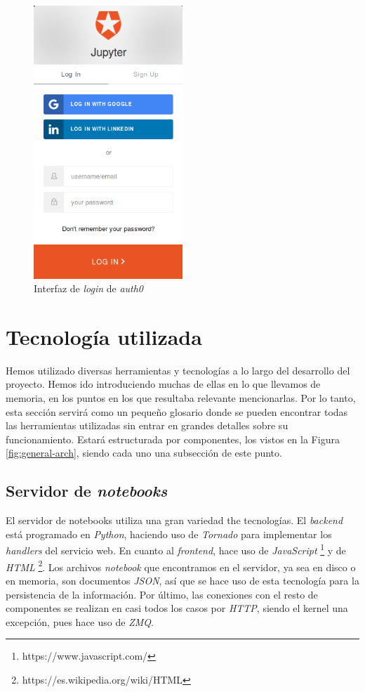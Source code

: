 \documentclass[11pt,spanish,listoffigures,listoftables]{tfgetsinf}
\begin{document}
\begin{figure}[H]
	\centering
  	\includegraphics[width=0.5\textwidth]{login.png}
  	\caption{Interfaz de \textit{login} de \textit{auth0}}
  	\label{fig:login}
\end{figure}



\section{Tecnología utilizada}
\label{sec:tecno-utilizada}

Hemos utilizado diversas herramientas y tecnologías a lo largo del desarrollo del proyecto. Hemos ido introduciendo muchas de ellas en lo que llevamos de memoria, en los puntos en los que resultaba relevante mencionarlas. Por lo tanto, esta sección servirá como un pequeño glosario donde se pueden encontrar todas las herramientas utilizadas sin entrar en grandes detalles sobre su funcionamiento. Estará estructurada por componentes, los vistos en la Figura \ref{fig:general-arch}, siendo cada uno una subsección de este punto.


\subsection{Servidor de \textit{notebooks}}
\label{subsec:tecno-server}

El servidor de notebooks utiliza una gran variedad the tecnologías. El \textit{backend} está programado en \textit{Python}, haciendo uso de \textit{Tornado} para implementar los \textit{handlers} del servicio web. En cuanto al \textit{frontend}, hace uso de \textit{JavaScript} \footnote{https://www.javascript.com/} y de \textit{HTML} \footnote{https://es.wikipedia.org/wiki/HTML}. Los archivos \textit{notebook} que encontramos en el servidor, ya sea en disco o en memoria, son documentos \textit{JSON}, así que se hace uso de esta tecnología para la persistencia de la información. Por último, las conexiones con el resto de componentes se realizan en casi todos los casos por \textit{HTTP}, siendo el kernel una excepción, pues hace uso de \textit{ZMQ}. 
\end{document}
